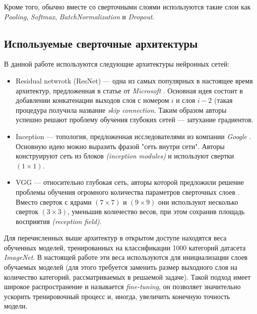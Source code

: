 \indent
\indent
Кроме того, обычно вместе со сверточными слоями используются такие 
слои как \textit{Pooling}, \textit{Softmax}, 
\textit{BatchNormalization}\cite{batchnorm}  и \textit{Dropout}\cite{dropout}.


\subsection{Используемые сверточные архитектуры}
\label{section:archs}

\indent
\indent
В данной работе используются следующие архитектуры нейронных сетей:


\begin{itemize}

    \item Residual netwrotk (ResNet) ---
    одна из самых популярных в настоящее время архитектур,
    предложенная в статье от \textit{Microsoft} \cite{resnet}.
    Основная идея состоит в добавлении конкатенации выходов
    слоя с номером  $i$ и слоя $i - 2$ (такая процедура
    получила название \textit{skip connection}. Таким образом авторы
    успешно решают проблему 
    обучения глубоких сетей --- затухание градиентов.
    
    \item {Inception} --- топология, предложенная исследователями 
    из компании \textit{Google} \cite{inception}. Основную идею
    можно выразить фразой "сеть внутри сети". Авторы 
    конструируют сеть из блоков \textit{(inception modules)} и
    используют свертки $(1 \times 1)$.
    
    \item {VGG} --- относительно глубокая сеть, авторы которой предложили
    решение проблемы обучения огромного количества параметров
    сверточных слоев \cite{vgg}. Вместо сверток с ядрами $(7 \times 7)$ и
    $(9 \times 9)$ они используют несколько сверток $(3 \times 3)$, уменьшив
    количество весов, при этом сохранив 
    площадь восприятия \textit{(reception field)}.
    
\end{itemize}

\indent
\indent
Для перечисленных выше архитектур в открытом доступе находятся 
веса обученных моделей, тренированных на классификации 1000
категорий датасета \textit{ImageNet}\cite{imagenet}. В настоящей работе
эти веса используются для инициализации слоев обучаемых моделей
(для этого требуется заменить размер выходного слоя на количество
категорий, рассматриваемых в решаемой задаче).
Такой подход имеет широкое распространение 
и называется \textit{fine-tuning}, он позволяет значительно ускорить
тренировочный процесс и, иногда, увеличить конечную точность модели.

